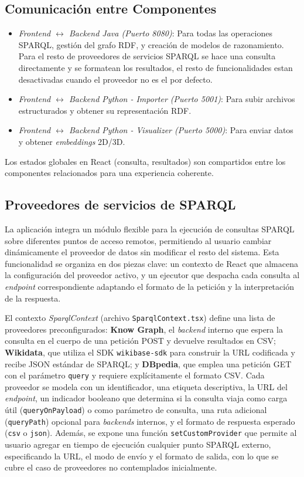 \documentclass{article}
\begin{document}
\subsection{Comunicación entre Componentes}
\begin{itemize}
    \item \textit{Frontend $\leftrightarrow$ Backend Java (Puerto 8080)}: Para todas las operaciones SPARQL, gestión del grafo RDF, y creación de modelos de razonamiento. Para el resto de proveedores de servicios SPARQL se hace una consulta directamente y se formatean los resultados, el resto de funcionalidades estan desactivadas cuando el proveedor no es el por defecto.
    \item \textit{Frontend $\leftrightarrow$ Backend Python - Importer (Puerto 5001)}: Para subir archivos estructurados y obtener su representación RDF.
    \item \textit{Frontend $\leftrightarrow$ Backend Python - Visualizer (Puerto 5000)}: Para enviar datos y obtener \textit{embeddings} 2D/3D.
\end{itemize}
Los estados globales en React (consulta, resultados) son compartidos entre los componentes relacionados para una experiencia coherente.


\subsection{Proveedores de servicios de SPARQL}

La aplicación integra un módulo flexible para la ejecución de consultas SPARQL sobre diferentes puntos de acceso remotos, permitiendo al usuario cambiar dinámicamente el proveedor de datos sin modificar el resto del sistema. Esta funcionalidad se organiza en dos piezas clave: un contexto de React que almacena la configuración del proveedor activo, y un ejecutor que despacha cada consulta al \textit{endpoint} correspondiente adaptando el formato de la petición y la interpretación de la respuesta.

El contexto \textit{SparqlContext} (archivo \texttt{SparqlContext.tsx}) define una lista de proveedores preconfigurados: \textbf{Know Graph}, el \textit{backend} interno que espera la consulta en el cuerpo de una petición POST y devuelve resultados en CSV; \textbf{Wikidata}, que utiliza el SDK \texttt{wikibase-sdk} para construir la URL codificada y recibe JSON estándar de SPARQL; y \textbf{DBpedia}, que emplea una petición GET con el parámetro \texttt{query} y requiere explícitamente el formato CSV. Cada proveedor se modela con un identificador, una etiqueta descriptiva, la URL del \textit{endpoint}, un indicador booleano que determina si la consulta viaja como carga útil (\texttt{queryOnPayload}) o como parámetro de consulta, una ruta adicional (\texttt{queryPath}) opcional para \textit{backends} internos, y el formato de respuesta esperado (\texttt{csv} o \texttt{json}). Además, se expone una función \texttt{setCustomProvider} que permite al usuario agregar en tiempo de ejecución cualquier punto SPARQL externo, especificando la URL, el modo de envío y el formato de salida, con lo que se cubre el caso de proveedores no contemplados inicialmente.
\end{document}
